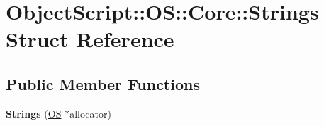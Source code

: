 \hypertarget{struct_object_script_1_1_o_s_1_1_core_1_1_strings}{}\section{Object\+Script\+:\+:OS\+:\+:Core\+:\+:Strings Struct Reference}
\label{struct_object_script_1_1_o_s_1_1_core_1_1_strings}
\subsection*{Public Member Functions}
\begin{DoxyCompactItemize}
\item 
{\bfseries Strings} (\hyperlink{class_object_script_1_1_o_s}{OS} $\ast$allocator)\hypertarget{struct_object_script_1_1_o_s_1_1_core_1_1_strings_a83ce3800c1489dc5791c0ead3018167e}{}\label{struct_object_script_1_1_o_s_1_1_core_1_1_strings_a83ce3800c1489dc5791c0ead3018167e}

\end{DoxyCompactItemize}
